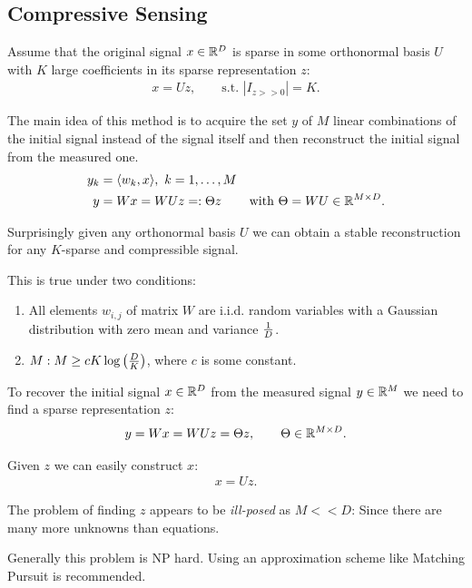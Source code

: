 \subsection{Compressive Sensing}
Assume that the original signal $x\in \mathbb{R}^D$ is sparse in some orthonormal basis $U$ with $K$ large coefficients in its sparse representation $z$:
\begin{align*}
    x= Uz,\qquad \text{s.t. }|I_{z>>0}| = K.
\end{align*}

The main idea of this method is to acquire the set $y$ of $M$ linear combinations of the initial signal instead of the signal itself and then reconstruct the initial signal from the measured one. 
\begin{align*}
    y_k &= \langle w_k, x\rangle,\ k=1,\ldots,M\\
    y &= Wx = WUz =: \Theta z &\text{with } \Theta = WU \in \mathbb{R}^{M\times D}.
\end{align*}


Surprisingly given any orthonormal basis $U$ we can obtain a stable reconstruction for any $K$-sparse and compressible signal.

This is true under two conditions:
\begin{enumerate}
    \item All elements $w_{i,j}$ of matrix $W$ are i.i.d. random variables with a Gaussian distribution with zero mean and variance ${1\over D}$.
    \item $M:M \geq cK\log\left({D\over K}\right)$, where $c$ is some constant.
\end{enumerate}

To recover the initial signal $x\in \mathbb{R}^D$ from the measured signal $y\in \mathbb{R}^M$ we need to find a sparse representation $z$:
\begin{align*}
    y = Wx = WUz = \Theta z, \qquad \Theta \in \mathbb{R}^{M\times D}.
\end{align*}

Given $z$ we can easily construct $x$:
\begin{align*}
    x = Uz.
\end{align*}

The problem of finding $z$ appears to be \emph{ill-posed} as $M<<D$: Since there are many more unknowns than equations.

Generally this problem is NP hard. Using an approximation scheme like Matching Pursuit is recommended.

